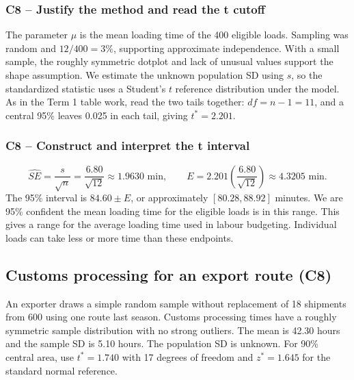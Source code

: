 	\subsubsection*{C8 -- Justify the method and read the t cutoff}

	The parameter $\mu$ is the mean loading time of the 400 eligible loads. Sampling was random and $12/400=3\%$, supporting approximate independence. With a small sample, the roughly symmetric dotplot and lack of unusual values support the shape assumption. We estimate the unknown population SD using $s$, so the standardized statistic uses a Student's $t$ reference distribution under the model. As in the Term 1 table work, read the two tails together: $df=n-1=11$, and a central 95\% leaves 0.025 in each tail, giving $t^*=2.201$.


	\label{sol:c8-1-b}
	\subsubsection*{C8 -- Construct and interpret the t interval}

	\[
	\widehat{SE}=\frac{s}{\sqrt n}=\frac{6.80}{\sqrt{12}}\approx1.9630\text{ min},
	\qquad E=2.201\left(\frac{6.80}{\sqrt{12}}\right)\approx4.3205\text{ min}.
	\]
	The 95\% interval is $84.60\pm E$, or approximately $[80.28,88.92]$ minutes. We are 95\% confident the mean loading time for the eligible loads is in this range. This gives a range for the average loading time used in labour budgeting. Individual loads can take less or more time than these endpoints.


	\clearpage

	\subsection{Customs processing for an export route (C8)}
	\label{prob:c8-2}

	An exporter draws a simple random sample without replacement of 18 shipments from 600 using one route last season. Customs processing times have a roughly symmetric sample distribution with no strong outliers. The mean is 42.30 hours and the sample SD is 5.10 hours. The population SD is unknown. For 90\% central area, use $t^*=1.740$ with 17 degrees of freedom and $z^*=1.645$ for the standard normal reference.

